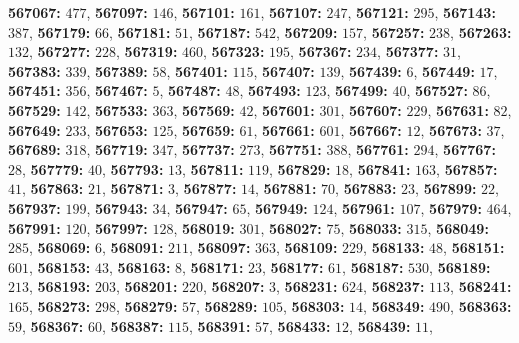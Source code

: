 \textsf{\bfseries 567067:} $477$, \textsf{\bfseries 567097:} $146$, \textsf{\bfseries 567101:} $161$, \textsf{\bfseries 567107:} $247$, \textsf{\bfseries 567121:} $295$, \textsf{\bfseries 567143:} $387$, \textsf{\bfseries 567179:} $66$, \textsf{\bfseries 567181:} $51$, \textsf{\bfseries 567187:} $542$, \textsf{\bfseries 567209:} $157$, \textsf{\bfseries 567257:} $238$, \textsf{\bfseries 567263:} $132$, \textsf{\bfseries 567277:} $228$, \textsf{\bfseries 567319:} $460$, \textsf{\bfseries 567323:} $195$, \textsf{\bfseries 567367:} $234$, \textsf{\bfseries 567377:} $31$, \textsf{\bfseries 567383:} $339$, \textsf{\bfseries 567389:} $58$, \textsf{\bfseries 567401:} $115$, \textsf{\bfseries 567407:} $139$, \textsf{\bfseries 567439:} $6$, \textsf{\bfseries 567449:} $17$, \textsf{\bfseries 567451:} $356$, \textsf{\bfseries 567467:} $5$, \textsf{\bfseries 567487:} $48$, \textsf{\bfseries 567493:} $123$, \textsf{\bfseries 567499:} $40$, \textsf{\bfseries 567527:} $86$, \textsf{\bfseries 567529:} $142$, \textsf{\bfseries 567533:} $363$, \textsf{\bfseries 567569:} $42$, \textsf{\bfseries 567601:} $301$, \textsf{\bfseries 567607:} $229$, \textsf{\bfseries 567631:} $82$, \textsf{\bfseries 567649:} $233$, \textsf{\bfseries 567653:} $125$, \textsf{\bfseries 567659:} $61$, \textsf{\bfseries 567661:} $601$, \textsf{\bfseries 567667:} $12$, \textsf{\bfseries 567673:} $37$, \textsf{\bfseries 567689:} $318$, \textsf{\bfseries 567719:} $347$, \textsf{\bfseries 567737:} $273$, \textsf{\bfseries 567751:} $388$, \textsf{\bfseries 567761:} $294$, \textsf{\bfseries 567767:} $28$, \textsf{\bfseries 567779:} $40$, \textsf{\bfseries 567793:} $13$, \textsf{\bfseries 567811:} $119$, \textsf{\bfseries 567829:} $18$, \textsf{\bfseries 567841:} $163$, \textsf{\bfseries 567857:} $41$, \textsf{\bfseries 567863:} $21$, \textsf{\bfseries 567871:} $3$, \textsf{\bfseries 567877:} $14$, \textsf{\bfseries 567881:} $70$, \textsf{\bfseries 567883:} $23$, \textsf{\bfseries 567899:} $22$, \textsf{\bfseries 567937:} $199$, \textsf{\bfseries 567943:} $34$, \textsf{\bfseries 567947:} $65$, \textsf{\bfseries 567949:} $124$, \textsf{\bfseries 567961:} $107$, \textsf{\bfseries 567979:} $464$, \textsf{\bfseries 567991:} $120$, \textsf{\bfseries 567997:} $128$, \textsf{\bfseries 568019:} $301$, \textsf{\bfseries 568027:} $75$, \textsf{\bfseries 568033:} $315$, \textsf{\bfseries 568049:} $285$, \textsf{\bfseries 568069:} $6$, \textsf{\bfseries 568091:} $211$, \textsf{\bfseries 568097:} $363$, \textsf{\bfseries 568109:} $229$, \textsf{\bfseries 568133:} $48$, \textsf{\bfseries 568151:} $601$, \textsf{\bfseries 568153:} $43$, \textsf{\bfseries 568163:} $8$, \textsf{\bfseries 568171:} $23$, \textsf{\bfseries 568177:} $61$, \textsf{\bfseries 568187:} $530$, \textsf{\bfseries 568189:} $213$, \textsf{\bfseries 568193:} $203$, \textsf{\bfseries 568201:} $220$, \textsf{\bfseries 568207:} $3$, \textsf{\bfseries 568231:} $624$, \textsf{\bfseries 568237:} $113$, \textsf{\bfseries 568241:} $165$, \textsf{\bfseries 568273:} $298$, \textsf{\bfseries 568279:} $57$, \textsf{\bfseries 568289:} $105$, \textsf{\bfseries 568303:} $14$, \textsf{\bfseries 568349:} $490$, \textsf{\bfseries 568363:} $59$, \textsf{\bfseries 568367:} $60$, \textsf{\bfseries 568387:} $115$, \textsf{\bfseries 568391:} $57$, \textsf{\bfseries 568433:} $12$, \textsf{\bfseries 568439:} $11$, 

